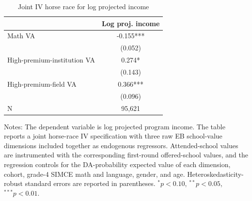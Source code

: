 \begin{table}[!htbp]
\centering
\caption{Joint IV horse race for log projected income}
\label{tab:program-income-math-highinst-highpay-joint}
\begin{tabular}{lc}
\toprule
 & Log proj. income \\
\midrule
Math VA & -0.155*** \\
 & (0.052) \\
High-premium-institution VA & 0.274* \\
 & (0.143) \\
High-premium-field VA & 0.366*** \\
 & (0.096) \\
\midrule
N & 95,621 \\
\bottomrule
\end{tabular}
\par\medskip
\footnotesize
\begin{minipage}{\textwidth}
Notes: The dependent variable is log projected program income. The table reports a joint horse-race IV specification with three raw EB school-value dimensions included together as endogenous regressors. Attended-school values are instrumented with the corresponding first-round offered-school values, and the regression controls for the DA-probability expected value of each dimension, cohort, grade-4 SIMCE math and language, gender, and age. Heteroskedasticity-robust standard errors are reported in parentheses. $^{*}p<0.10$, $^{**}p<0.05$, $^{***}p<0.01$.
\end{minipage}
\end{table}
